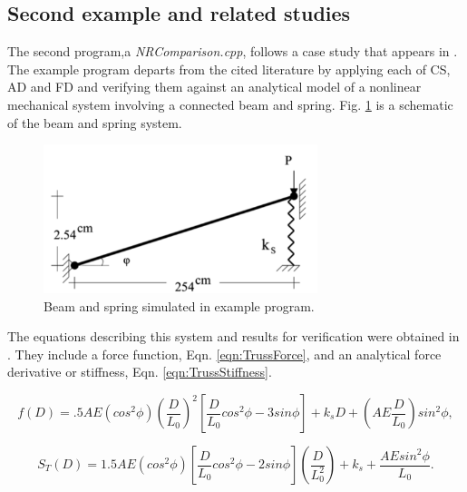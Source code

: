 \documentclass[preprint,12pt]{elsarticle}
\begin{document}
\subsection{Second example and related studies} 
\label{subsec:Validation}
The second program,a \emph{NRComparison.cpp}, follows a case study that appears in
\cite{rezaiee2010dynamic}. The example program departs from the cited
literature by applying each of CS, AD and FD and verifying them against an
analytical model of a nonlinear mechanical system involving a connected beam
and spring. Fig. \ref{fig:TrussSchematic} is a schematic of the beam and spring
system. 

\begin{figure}[tbp]
  \centering
  \includegraphics[width=8cm]{./figs/truss.png}
  \caption{Beam and spring simulated in example program.}
  \label{fig:TrussSchematic}
\end{figure}

The equations describing this system and results for verification were obtained
in \cite{rezaiee2010dynamic}. They include a force function, Eqn.
\ref{eqn:TrussForce}, and an analytical force derivative or stiffness, Eqn.
\ref{eqn:TrussStiffness}.

\begin{equation} 
    \label{eqn:TrussForce}
    f(D) = .5AE(cos^{2}\phi)(\frac{D}{L_{0}})^{2}[\frac{D}{L_{0}}cos^{2}\phi - 3sin\phi] + k_{s}D + (AE\frac{D}{L_{0}})sin^{2}\phi,
\end{equation} 

\begin{equation} 
    \label{eqn:TrussStiffness}
    S_{T}(D) = 1.5AE(cos^{2}\phi)[\frac{D}{L_{0}}cos^{2}\phi - 2sin\phi](\frac{D}{L_{0}^{2}}) + k_{s} + \frac{AEsin^{2}\phi}{L_{0}}.
\end{equation}
\end{document}
